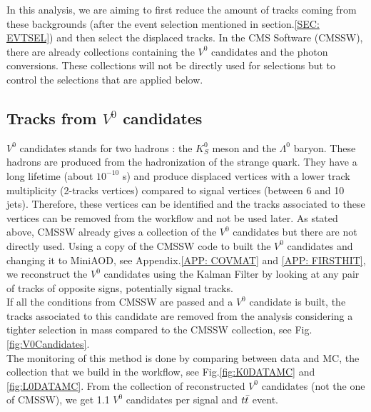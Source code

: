 \documentclass{cernatlasnote}
\begin{document}
In this analysis, we are aiming to first reduce the amount of tracks coming from these backgrounds (after the event selection mentioned in section.\ref{SEC: EVTSEL}) and then select the displaced tracks. In the CMS Software (CMSSW), there are already collections containing the $V^0$ candidates and the photon conversions. These collections will not be directly used for selections but to control the selections that are applied below.

\subsection{Tracks from $V^0$ candidates}
$V^0$ candidates stands for two hadrons : the $K^0_S$ meson and the $\Lambda^{0}$ baryon. These hadrons are produced from the hadronization of the strange quark. They have a long lifetime (about $10^{-10}$ s) and produce  displaced vertices with a lower track multiplicity (2-tracks vertices) compared to signal vertices (between 6 and 10 jets). Therefore, these vertices can be identified and the tracks associated to these vertices can be removed from the workflow and not be used later.
As stated above, CMSSW already gives a collection of the $V^0$ candidates \cite{V0CAND} but there are not directly used. Using a copy of the CMSSW code to built the $V^0$ candidates and changing it to MiniAOD, see Appendix.\ref{APP: COVMAT} and \ref{APP: FIRSTHIT}, we reconstruct the  $V^0$ candidates using the Kalman Filter \cite{KVF} by looking at any pair of tracks of opposite signs, potentially signal tracks.\\
If all the conditions from CMSSW are passed and a $V^0$ candidate is built, the tracks associated to this candidate are removed from the analysis considering a tighter selection in mass compared to the CMSSW collection, see Fig.\ref{fig:V0Candidates}.\\

The monitoring of this method is done by comparing between data and MC, the collection that we build in the workflow, see Fig.\ref{fig:K0DATAMC} and \ref{fig:L0DATAMC}. From the collection of reconstructed $V^0$ candidates (not the one of CMSSW), we get 1.1 $V^0$ candidates per signal and $t\Bar{t}$ event.
   
\end{document}
